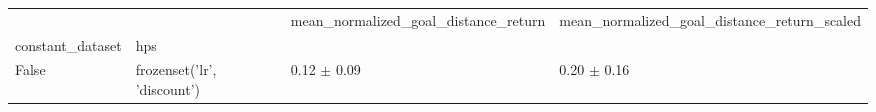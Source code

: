 \begin{tabular}{llll}
\toprule
 &  & mean_normalized_goal_distance_return & mean_normalized_goal_distance_return_scaled \\
constant_dataset & hps &  &  \\
\midrule
False & frozenset({'lr', 'discount'}) & 0.12 $\pm$ 0.09 & 0.20 $\pm$ 0.16 \\
\cline{1-4}
\bottomrule
\end{tabular}
